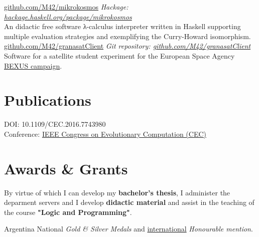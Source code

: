 \documentclass[nocolors]{friggeri-cv-a4}
\begin{document}
\begin{entrylist}
{\href{https://github.com/M42/mikrokosmos}{github.com/M42/mikrokosmos}}
{\emph{Hackage: \href{https://hackage.haskell.org/package/mikrokosmos}{hackage.haskell.org/package/mikrokosmos}} \\
  An didactic free software λ-calculus interpreter written in Haskell supporting multiple evaluation strategies and exemplifying the Curry-Howard isomorphism.
}
{\href{https://github.com/M42/granasatClient}{github.com/M42/granasatClient}}
{\emph{Git repository: \href{https://github.com/M42/granasatClient}{github.com/M42/granasatClient}} \\
  Software for a satellite student experiment for the
  European Space Agency \href{http://rexusbexus.net/}{BEXUS campaign}.
}
\end{entrylist}

\section{Publications}

\begin{entrylist}
  {
    DOI: 10.1109/CEC.2016.7743980 \\
    Conference: \href{http://ieeexplore.ieee.org/document/7743980/2016}{IEEE Congress on Evolutionary Computation (CEC)}
    }
\end{entrylist}

\section{Awards \& Grants}

\begin{entrylist}

  {By virtue of which I can develop my \textbf{bachelor's thesis}, I administer the deparment
    servers and I develop \textbf{didactic material} and assist in the teaching of the course
    \textbf{"Logic and Programming"}.
  }
  
{Argentina}
{National \emph{Gold \& Silver Medals} and
\href{https://www.imo-official.org/team_r.aspx?code=ESP&year=2012}{international} \emph{Honourable mention}.}

\end{entrylist}
\end{document}
